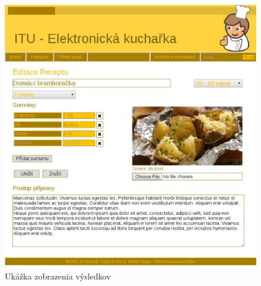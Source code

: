 \documentclass[12pt,a4paper,titlepage,final]{article}
\begin{document}
\begin{figure}

\begin{center}

\includegraphics[scale=0.7]{img/edit.eps} 
\caption{Ukážka zobrazenia výsledkov}
\label{koncept}

\end{center}

\end{figure}
\end{document}
